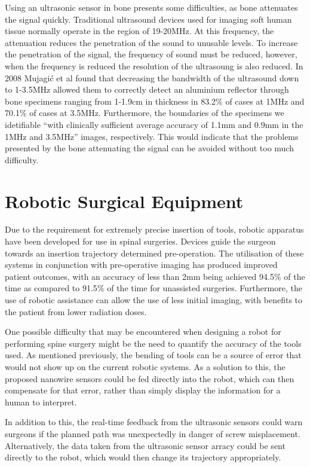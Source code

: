 \documentclass[conference, a4paper]{IEEEtran}
\begin{document}
Using an ultrasonic sensor in bone presents some difficulties, as bone attenuates
the signal quickly. Traditional ultrasound devices used for imaging soft
human tissue normally operate in the region of 19-20MHz. At this frequency,
the attenuation reduces the penetration of the sound to unusable levels\cite{Laugier2011}.
To increase the penetration of the signal, the frequency of sound must be reduced, however,
when the frequency is reduced the resolution of the ultrasoung is also reduced. In 2008 Mujagić
et al found that decreasing the bandwidth of the ultrasound down to 1-3.5MHz allowed them to
correctly detect an aluminium reflector through bone specimens ranging from 1-1.9cm in thickness in
83.2$\%$ of cases at 1MHz and 70.1$\%$ of cases at 3.5MHz. Furthermore, the boundaries
of the specimens we idetifiable ``with clinically sufficient average accuracy of 1.1mm and 0.9mm in the 1MHz
and 3.5MHz'' images, respectively\cite{Mujagic2008}. This would indicate that the 
problems presented by the bone attenuating the signal can be avoided without too much
difficulty.



\section{Robotic Surgical Equipment}
Due to the requirement for extremely precise insertion of tools, robotic apparatus have been
developed for use in spinal surgeries. Devices guide the surgeon towards an insertion trajectory
determined pre-operation\cite{Hu2012}. The utilisation of these systems in conjunction with pre-operative
imaging has produced improved patient outcomes, with an accuracy of less than 2mm being
achieved 94.5$\%$ of the time as compared to 91.5$\%$ of the time for unassisted surgeries\cite{Kantelhardt2011}.
Furthermore, the use of robotic assistance can allow the use of less initial imaging, with benefits
to the patient from lower radiation doses.

One possible difficulty that may be encountered when designing a robot for performing
spine surgery might be the need to quantify the accuracy of the tools used. As mentioned
previously, the bending of tools can be a source of error that would not show up on the
current robotic systems. As a solution to this, the proposed nanowire sensors could
be fed directly into the robot, which can then compensate for that error, rather than 
simply display the information for a human to interpret.

In addition to this, the real-time feedback from the ultrasonic sensors could warn surgeons
if the planned path was unexpectedly in danger of screw misplacement. Alternatively, the 
data taken from the ultrasonic sensor arracy could be sent directly to the robot, which
would then change its trajectory appropriately.
\end{document}
